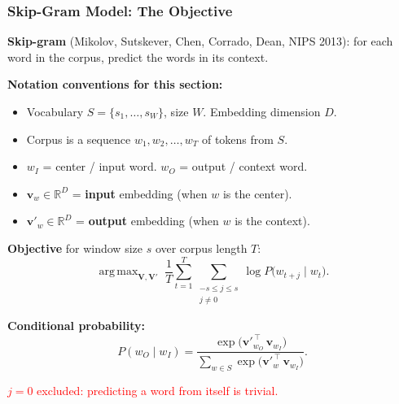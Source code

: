 \documentclass[notes,11pt, aspectratio=169]{beamer}
\DeclareMathOperator*{\argmax}{arg\,max}
\newcommand{\vv}{\mathbf{v}}
\newcommand{\vV}{\mathbf{V}}
\newcommand{\R}{\mathbb{R}}
\begin{document}
\begin{frame}
\frametitle{Skip-Gram Model: The Objective}

\textbf{Skip-gram} (Mikolov, Sutskever, Chen, Corrado, Dean, NIPS 2013): for each word in the corpus, predict the words in its context.

\vspace{6pt}
\begin{center}
\end{center}

\vspace{6pt}
\textbf{Notation conventions for this section:}
\begin{itemize}
    \item Vocabulary $S = \{s_1, \ldots, s_W\}$, size $W$. Embedding dimension $D$.
    \item Corpus is a sequence $w_1, w_2, \ldots, w_T$ of tokens from $S$.
    \item $w_I$ = center / input word. $w_O$ = output / context word.
    \item $\vv_w \in \R^D$ = \textbf{input} embedding (when $w$ is the center).
    \item $\vv'_w \in \R^D$ = \textbf{output} embedding (when $w$ is the context).
\end{itemize}

\vspace{6pt}
\textbf{Objective} for window size $s$ over corpus length $T$:
\[
    \argmax_{\vV, \vV'} \;\frac{1}{T} \sum_{t=1}^T \sum_{\substack{-s \leq j \leq s \\ j \neq 0}} \log P\bigl(w_{t+j} \mid w_t\bigr).
\]

\vspace{4pt}
\textbf{Conditional probability:}
\[
    P(w_O \mid w_I) = \frac{\exp\!\bigl(\vv'^{\,\top}_{w_O}\, \vv_{w_I}\bigr)}
                           {\sum_{w \in S} \exp\!\bigl(\vv'^{\,\top}_{w}\, \vv_{w_I}\bigr)}.
\]

\vspace{4pt}
\textcolor{red}{$j = 0$ excluded: predicting a word from itself is trivial.}
\end{frame}
\end{document}
